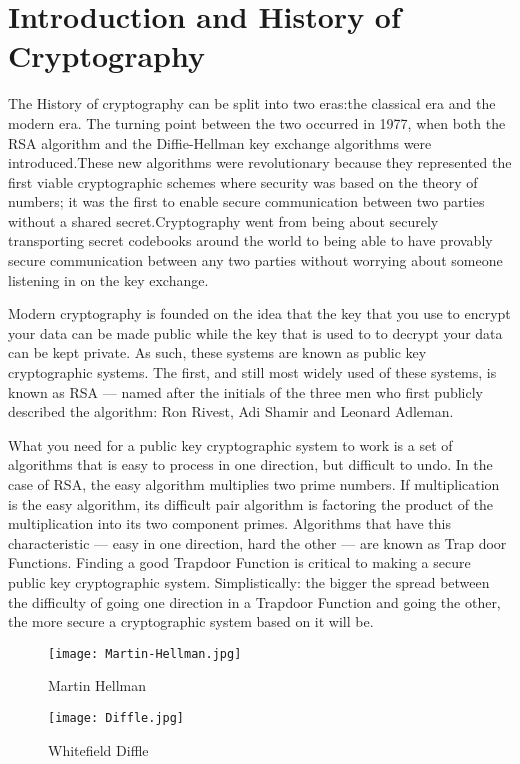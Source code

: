 \documentclass{article}
\begin{document}
\newpage
\section{Introduction and History of Cryptography}
The History of cryptography can be split into two eras:the classical era and the modern era. The turning point between the two occurred in 1977, when both the RSA algorithm and the Diffie-Hellman key exchange algorithms were introduced.These new algorithms were revolutionary because they represented the first viable cryptographic schemes where security was based on the theory of numbers; it was the first to enable secure communication between two parties without a shared secret.Cryptography went from being about securely transporting secret codebooks around the world to being able to have provably secure communication between any two parties without worrying about someone listening in on the key exchange.

Modern cryptography is founded on the idea that the key that you use to encrypt your data can be made public while the key that is used to to decrypt your data can be kept private. As such, these systems are known as public key cryptographic systems. The first, and still most widely used of these systems, is known as RSA — named after the initials of the three men who first publicly described the algorithm: Ron Rivest, Adi Shamir and Leonard Adleman.

What you need for a public key cryptographic system to work is a set of algorithms that is easy to process in one direction, but difficult to undo. In the case of RSA, the easy algorithm multiplies two prime numbers. If multiplication is the easy algorithm, its difficult pair algorithm is factoring the product of the multiplication into its two component primes. Algorithms that have this characteristic — easy in one direction, hard the other — are known as Trap door Functions. Finding a good Trapdoor Function is critical to making a secure public key cryptographic system. Simplistically: the bigger the spread between the difficulty of going one direction in a Trapdoor Function and going the other, the more secure a cryptographic system based on it will be.



\begin{figure}[hb]
  \centering
  \begin{minipage}[hb]{0.3\textwidth}
    \texttt{[image: Martin-Hellman.jpg]}
    \caption{Martin Hellman}
  \end{minipage}
  \hfill
  \begin{minipage}[hb]{0.3\textwidth}
    \texttt{[image: Diffle.jpg]}
    \caption{Whitefield Diffle}
  \end{minipage}
\end{figure}
\end{document}
